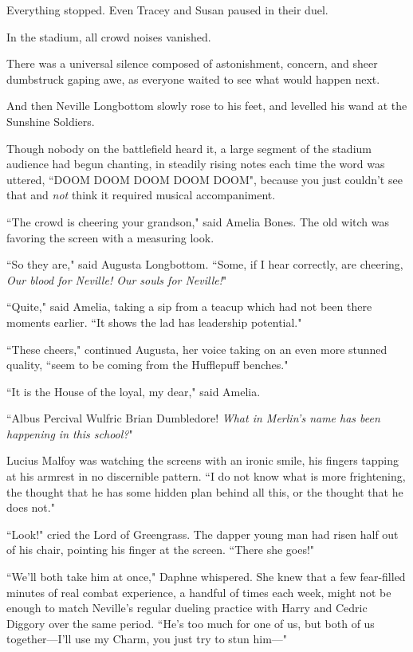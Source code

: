 Everything stopped. Even Tracey and Susan paused in their duel.

In the stadium, all crowd noises vanished.

There was a universal silence composed of astonishment, concern, and sheer dumbstruck gaping awe, as everyone waited to see what would happen next.

And then Neville Longbottom slowly rose to his feet, and levelled his wand at the Sunshine Soldiers.

Though nobody on the battlefield heard it, a large segment of the stadium audience had begun chanting, in steadily rising notes each time the word was uttered, ``DOOM DOOM DOOM DOOM DOOM", because you just couldn't see that and \emph{not} think it required musical accompaniment.

``The crowd is cheering your grandson," said Amelia Bones. The old witch was favoring the screen with a measuring look.

``So they are," said Augusta Longbottom. ``Some, if I hear correctly, are cheering, \emph{Our blood for Neville! Our souls for Neville!}"

``Quite," said Amelia, taking a sip from a teacup which had not been there moments earlier. ``It shows the lad has leadership potential."

``These cheers," continued Augusta, her voice taking on an even more stunned quality, ``seem to be coming from the Hufflepuff benches."

``It is the House of the loyal, my dear," said Amelia.

``Albus Percival Wulfric Brian Dumbledore! \emph{What in Merlin's name has been happening in this school?}"

Lucius Malfoy was watching the screens with an ironic smile, his fingers tapping at his armrest in no discernible pattern. ``I do not know what is more frightening, the thought that he has some hidden plan behind all this, or the thought that he does not."

``Look!" cried the Lord of Greengrass. The dapper young man had risen half out of his chair, pointing his finger at the screen. ``There she goes!"

\later

``We'll both take him at once," Daphne whispered. She knew that a few fear-filled minutes of real combat experience, a handful of times each week, might not be enough to match Neville's regular dueling practice with Harry and Cedric Diggory over the same period. ``He's too much for one of us, but both of us together—I'll use my Charm, you just try to stun him—"

